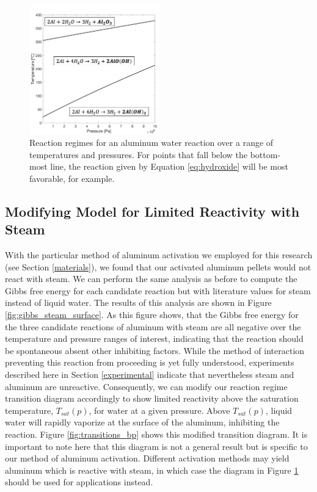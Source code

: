 \documentclass[preprint,12pt,3p]{elsarticle}
\begin{document}
\begin{figure}
  \centering
  \includegraphics[width=0.5\textwidth]{fig/transitions}
  \caption{Reaction regimes for an aluminum water reaction over a range of
  temperatures and pressures. For points that fall below the bottom-most line,
the reaction given by Equation \ref{eq:hydroxide} will be most favorable, for
example.}
  \label{fig:transitions}
\end{figure}

\subsection{Modifying Model for Limited Reactivity with Steam}

With the particular method of aluminum activation we employed for this research
(see Section \ref{materials}), we found that our activated aluminum pellets
would not react with steam. We can perform the same analysis as before to
compute the Gibbs free energy for each candidate reaction but with literature
values for steam instead of liquid water. The results of this analysis are shown
in Figure \ref{fig:gibbs_steam_surface}. As this figure shows, that the Gibbs
free energy for the three candidate reactions of aluminum with steam are all
negative over the temperature and pressure ranges of interest, indicating that
the reaction should be spontaneous absent other inhibiting factors. While the
method of interaction preventing this reaction from proceeding is yet fully
understood, experiments described here in Section \ref{experimental} indicate
that nevertheless steam and aluminum are unreactive. Consequently, we can modify
our reaction regime transition diagram accordingly to show limited reactivity
above the saturation temperature, $T_{sat}(p)$, for water at a given pressure.
Above $T_{sat}(p)$, liquid water will rapidly vaporize at the surface of the
aluminum, inhibiting the reaction. Figure \ref{fig:transitions_bp} shows this
modified transition diagram. It is important to note here that this diagram is
not a general result but is specific to our method of aluminum activation.
Different activation methods may yield aluminum which is reactive with steam, in
which case the diagram in Figure \ref{fig:transitions} should be used for
applications instead.
\end{document}
